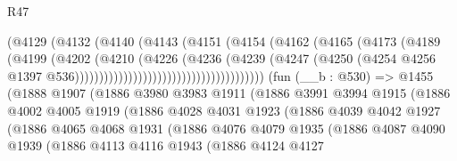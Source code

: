 \begin{lexlean}{R47}
\begin{coremodule}
                                            (@4129
                                              (@4132
                                                (@4140
                                                  (@4143
                                                    (@4151
                                                      (@4154
                                                        (@4162
                                                          (@4165
                                                            (@4173
                                                              (@4189
                                                                (@4199
                                                                  (@4202
                                                                    (@4210
                                                                      (@4226
                                                                        (@4236
                                                                          (@4239
                                                                            (@4247
                                                                              (@4250
                                                                                (@4254
                                                                                  @4256
                                                                                  @1397
                                                                                  @536)))))))))))))))))))))))))))))))))))))))
    (fun (__b : @530) =>
    @1455
      (@1888
        @1907
        (@1886
          @3980
          @3983
          @1911
          (@1886
            @3991
            @3994
            @1915
            (@1886
              @4002
              @4005
              @1919
              (@1886
                @4028
                @4031
                @1923
                (@1886
                  @4039
                  @4042
                  @1927
                  (@1886
                    @4065
                    @4068
                    @1931
                    (@1886
                      @4076
                      @4079
                      @1935
                      (@1886
                        @4087
                        @4090
                        @1939
                        (@1886
                          @4113
                          @4116
                          @1943
                          (@1886
                            @4124
                            @4127

\end{coremodule}
\end{lexlean}
